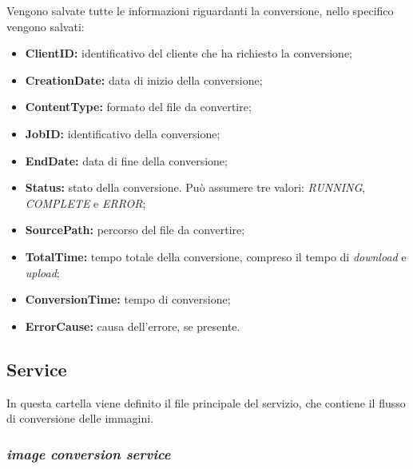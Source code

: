Vengono salvate tutte le informazioni riguardanti la conversione, nello
specifico vengono salvati:
\begin{itemize}
    \item \textbf{ClientID:} identificativo del cliente che ha richiesto la
          conversione;
    \item \textbf{CreationDate:} data di inizio della conversione;
    \item \textbf{ContentType:} formato del file da convertire;
    \item \textbf{JobID:} identificativo della conversione;
    \item \textbf{EndDate:} data di fine della conversione;
    \item \textbf{Status:} stato della conversione. Può assumere tre valori: \emph{RUNNING}, \emph{COMPLETE} e \emph{ERROR};
    \item \textbf{SourcePath:} percorso del file da convertire;
    \item \textbf{TotalTime:} tempo totale della conversione, compreso il tempo
          di \emph{download} e \emph{upload};
    \item \textbf{ConversionTime:} tempo di conversione;
    \item \textbf{ErrorCause:} causa dell'errore, se presente.
\end{itemize}

\subsection{Service}

In questa cartella viene definito il file principale del servizio, che contiene
il flusso di conversione delle immagini.

\subsubsection{\emph{image conversion service}}

